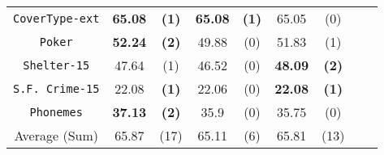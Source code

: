 \begin{table}
\begin{tabular}{c|cc|cc|cc|cc}
{\tt CoverType-ext} &  {\bf 65.08} & {\bf (1)}    &  {\bf 65.08} & {\bf (1)}    &  65.05       & (0)         & &        \\
{\tt Poker}         &  {\bf 52.24} & {\bf (2)}    &  49.88       & (0)          &  51.83       & (1)         & &        \\ 
{\tt Shelter-15}    &  47.64       & (1)          &  46.52       & (0)          & {\bf 48.09}  & {\bf (2)}   & &        \\ 
{\tt S.F. Crime-15} &  22.08       & {\bf (1)}    &  22.06       & (0)          & {\bf 22.08}  & {\bf (1)}   & &        \\   
{\tt Phonemes}      &  {\bf 37.13} & {\bf (2)}    &  35.9        & (0)          & 35.75        & (0)         & &        \\  \hline
Average (Sum)       &  65.87       &  (17)        &  65.11       & (6)          & 65.81        & (13)    
\end{tabular}
\normalsize
\label{tab:CrossVal-a}
\end{table}

